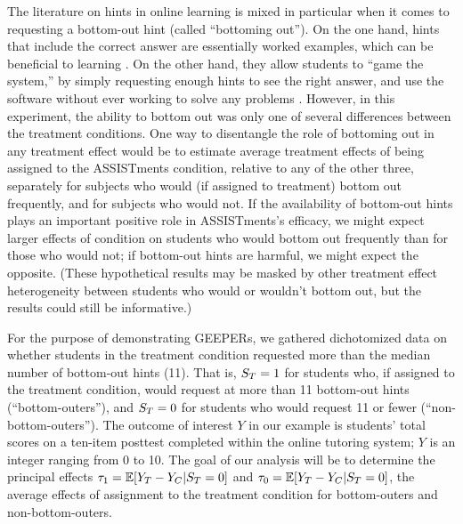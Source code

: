 \documentclass{statsoc} %
\begin{document}
The literature on hints in online learning is mixed \citep[see, e.g.,][]{aleven2016help,goldin2012learner,sales2021student} in particular when it comes to requesting a bottom-out hint (called ``bottoming out''). On the one hand, hints that include the correct answer are essentially worked examples, which can be beneficial to learning \citep[e.g.]{sweller1985use}. On the other hand, they allow students to ``game the system,'' by simply requesting enough hints to see the right answer, and use the software without ever working to solve any problems \citep[e.g.][]{guo2008trying}. However, in this experiment, the ability to bottom out was only one of several differences between the treatment conditions. One way to disentangle the role of bottoming out in any treatment effect would be to estimate average treatment effects of being assigned to the ASSISTments condition, relative to any of the other three, separately for subjects who would (if assigned to treatment) bottom out frequently, and for subjects who would not. 
If the availability of bottom-out hints plays an important positive role in ASSISTments's efficacy, we might expect larger effects of condition on students who would bottom out frequently than for those who would not; if bottom-out hints are harmful, we might expect the opposite. 
(These hypothetical results may be masked by other treatment effect heterogeneity between students who would or wouldn't bottom out, but the results could still be informative.)

\sloppy
For the purpose of demonstrating GEEPERs, we gathered dichotomized data on %
whether students in the treatment condition requested more than the median number of bottom-out hints (11).
That is, $S_T=1$ for students who, if assigned to the treatment condition, would request at more than 11 bottom-out hints (``bottom-outers''), and $S_T=0$ for students who would request 11 or fewer (``non-bottom-outers''). %
The outcome of interest $Y$ in our example is students' total scores on a ten-item posttest completed within the online tutoring system; $Y$ is an integer ranging from 0 to 10.
The goal of our analysis will be to determine the principal effects $\tau_1=\mathbb{E}[Y_T-Y_C|S_T=0]$ and $\tau_0=\mathbb{E}[Y_T-Y_C|S_T=0]$, the average effects of assignment to the treatment condition for bottom-outers and non-bottom-outers.
\end{document}
